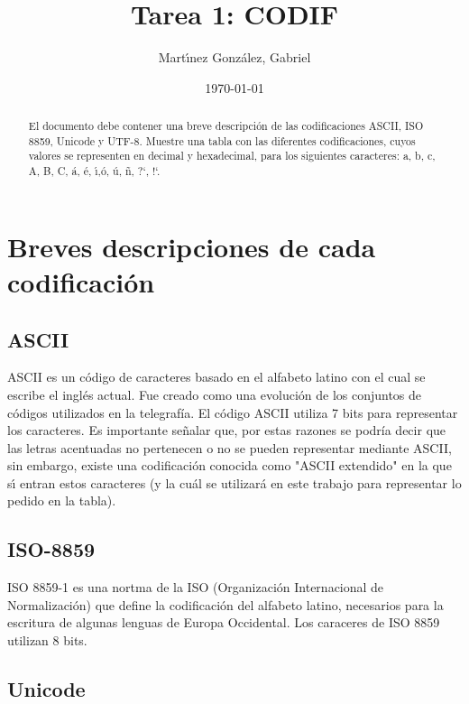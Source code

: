 \documentclass[12pt]{article}
\author{Mart\'{\i}nez Gonz\'alez, Gabriel}
\date{\today}
\title{Tarea 1: CODIF}
\begin{document}
\maketitle

\begin{abstract}

	El documento debe contener una breve descripci\'on de las codificaciones ASCII, ISO 8859, Unicode y UTF-8. Muestre una tabla con las diferentes codificaciones, cuyos valores se representen en decimal y hexadecimal, para los siguientes caracteres: a, b, c, A, B, C, \'a, \'e, \'{\i},\'o, \'u, \~n, ?`, !`.

\end{abstract}

\section{Breves descripciones de cada codificaci\'on}

\subsection{ASCII}

ASCII es un c\'odigo de caracteres basado en el alfabeto latino con el cual se escribe el ingl\'es actual. Fue creado como una evoluci\'on de los conjuntos de c\'odigos utilizados en la telegraf\'ia. El c\'odigo ASCII utiliza 7 bits para representar los caracteres.
Es importante señalar que, por estas razones se podría decir que las letras acentuadas no pertenecen o no se pueden representar mediante ASCII, sin embargo, existe una codificación conocida como "ASCII extendido" en la que s\'{\i} entran estos caracteres (y la cu\'al se utilizar\'a en este trabajo para representar lo pedido en la tabla).

\subsection{ISO-8859}

ISO 8859-1 es una nortma de la ISO (Organizaci\'on Internacional de Normalizaci\'on) que define la codificaci\'on del alfabeto latino, necesarios para la escritura de algunas lenguas de Europa Occidental. Los caraceres de ISO 8859 utilizan 8 bits.

\subsection{Unicode}
\end{document}
